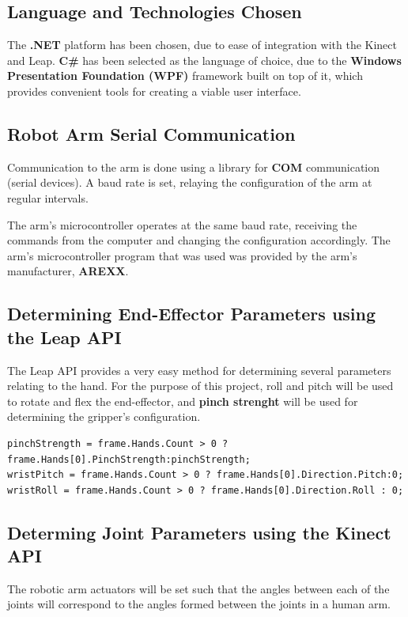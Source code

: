 \documentclass[12p,a4paper]{report}
\begin{document}
\subsection{Language and Technologies Chosen}

The \textbf{.NET} platform has been chosen, due to ease of integration with the Kinect and Leap. \textbf{C\#} has been selected as the language of choice, due to the \textbf{Windows Presentation Foundation (WPF)} framework built on top of it, which provides convenient tools for creating a viable user interface.  
\newpage
\subsection{Robot Arm Serial Communication}

Communication to the arm is done using a library for \textbf{COM} communication (serial devices). A baud rate is set, relaying the configuration of the arm at regular intervals.

The arm's microcontroller operates at the same baud rate, receiving the commands from the computer and changing the configuration accordingly. The arm's microcontroller program that was used was provided by the arm's manufacturer, \textbf{AREXX}.


\subsection{Determining End-Effector Parameters using the Leap API}

The Leap API provides a very easy method for determining several parameters relating to the hand. For the purpose of this project, roll and pitch will be used to rotate and flex the end-effector, and \textbf{pinch strenght} will be used for determining the gripper's configuration.

\begin{verbatim}
pinchStrength = frame.Hands.Count > 0 ? frame.Hands[0].PinchStrength:pinchStrength;
wristPitch = frame.Hands.Count > 0 ? frame.Hands[0].Direction.Pitch:0;
wristRoll = frame.Hands.Count > 0 ? frame.Hands[0].Direction.Roll : 0;
\end{verbatim}
\subsection{Determing Joint Parameters using the Kinect API}

The robotic arm actuators will be set such that the angles between each of the joints will correspond to the angles formed between the joints in a human arm.
\end{document}
